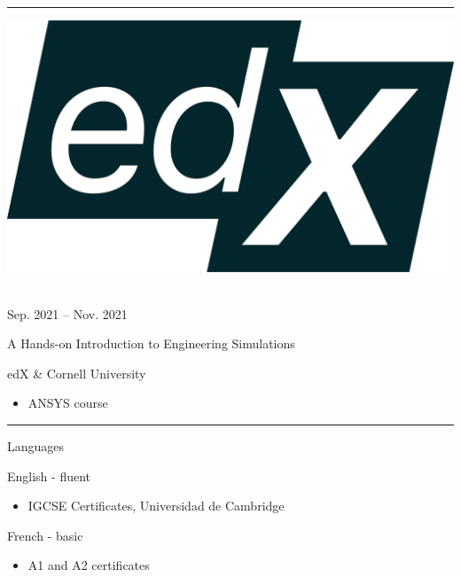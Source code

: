 \documentclass[a4paper,10pt]{article}
\newlength{\cvcolumngapwidth}
\newlength{\cvleftcolumnwidth}
\newlength{\cvrightcolumnwidth}
\newcommand{\cvsectionstyle}[1]{{\normalsize\cvsectionfont\textcolor{cvsectioncolor}{#1}}}
\newcommand{\cvtitlestyle}[1]{{\large\cvtitlefont\textcolor{cvtitlecolor}{#1}}}
\newcommand{\cvdurationstyle}[1]{{\small\cvdurationfont\textcolor{cvdurationcolor}{#1}}}
\newcommand{\cvheadingstyle}[1]{{\normalsize\cvheadingfont\textcolor{cvheadingcolor}{#1}}}
\newlength{\cvafteritemskipamount}
\newlength{\cvaftersectionskipamount}
\newlength{\cvbetweensectionandheadingextraskipamount}
\newlength{\cvaftertitleskipamount}
\newlength{\cvparskip}
\newcommand{\cvsection}[1]{
    \begin{minipage}[t]{\cvleftcolumnwidth}
        \raggedleft\cvsectionstyle{#1}
    \end{minipage}%
    \hspace{\cvcolumngapwidth}%
    \begin{minipage}[t]{\cvrightcolumnwidth}
        \textcolor{cvrulecolor}{\rule{\cvrightcolumnwidth}{0.3mm}}
    \end{minipage}

    \vspace{\cvaftersectionskipamount}
}
\newcommand{\cvitem}[2]{
    \begin{minipage}[t]{\cvleftcolumnwidth}
        \raggedleft #1
    \end{minipage}%
    \hspace{\cvcolumngapwidth}%
    \begin{minipage}[t]{\cvrightcolumnwidth}
        \setlength{\parskip}{\cvparskip} #2
    \end{minipage}

    \vspace{\cvafteritemskipamount}
}
\newcommand{\cvtitle}[1]{
    \cvtitlestyle{#1}

    \vspace{\cvaftertitleskipamount}
    \vspace{-\cvparskip}
}
\begin{document}
\cvsection{COURSES}

\cvitem{
    \begin{minipage}{\textwidth}
        \flushright
        \includegraphics[height=0.15\textwidth]{../logos-photos/Logo_edx.png}   
    \end{minipage}\\
    \vspace{0.1cm}
    \cvdurationstyle{Sep. 2021 -- Nov. 2021}
}{
    \cvtitle{A Hands-on Introduction to Engineering Simulations}
    edX \& Cornell University

    \begin{itemize}
        \item ANSYS course
    \end{itemize}
}
\cvsection{SKILLS}

\vspace{\cvbetweensectionandheadingextraskipamount}

\cvitem{
    \cvheadingstyle{Languages}
}{
    English - fluent 
    \begin{itemize}
        \item IGCSE Certificates, Universidad de Cambridge
    \end{itemize}

    French -  basic
    \begin{itemize}
        \item A1 and A2 certificates
    \end{itemize}
}

%     

%     
%     
%     









\end{document}
